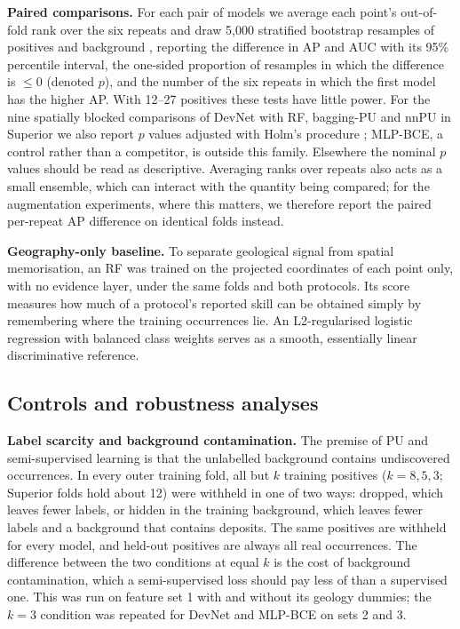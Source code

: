 \documentclass[pdflatex,sn-apa]{sn-jnl}
\begin{document}
\textbf{Paired comparisons.} For each pair of models we average each point's out-of-fold rank over the six repeats and draw 5,000 stratified bootstrap resamples of positives and background \citep{Efron1993}, reporting the difference in AP and AUC with its 95\% percentile interval, the one-sided proportion of resamples in which the difference is $\leq 0$ (denoted $p$), and the number of the six repeats in which the first model has the higher AP. With 12--27 positives these tests have little power. For the nine spatially blocked comparisons of DevNet with RF, bagging-PU and nnPU in Superior we also report $p$ values adjusted with Holm's procedure \citep{Holm1979}; MLP-BCE, a control rather than a competitor, is outside this family. Elsewhere the nominal $p$ values should be read as descriptive. Averaging ranks over repeats also acts as a small ensemble, which can interact with the quantity being compared; for the augmentation experiments, where this matters, we therefore report the paired per-repeat AP difference on identical folds instead.

\textbf{Geography-only baseline.} To separate geological signal from spatial memorisation, an RF was trained on the projected coordinates of each point only, with no evidence layer, under the same folds and both protocols. Its score measures how much of a protocol's reported skill can be obtained simply by remembering where the training occurrences lie. An L2-regularised logistic regression with balanced class weights serves as a smooth, essentially linear discriminative reference.

\subsection{Controls and robustness analyses}\label{sec:robust-methods}

\textbf{Label scarcity and background contamination.} The premise of PU and semi-supervised learning is that the unlabelled background contains undiscovered occurrences. In every outer training fold, all but $k$ training positives ($k = 8, 5, 3$; Superior folds hold about 12) were withheld in one of two ways: dropped, which leaves fewer labels, or hidden in the training background, which leaves fewer labels and a background that contains deposits. The same positives are withheld for every model, and held-out positives are always all real occurrences. The difference between the two conditions at equal $k$ is the cost of background contamination, which a semi-supervised loss should pay less of than a supervised one. This was run on feature set 1 with and without its geology dummies; the $k = 3$ condition was repeated for DevNet and MLP-BCE on sets 2 and 3.
\end{document}

